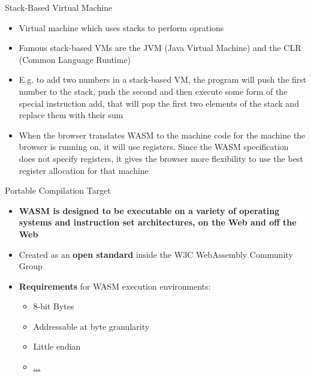 \documentclass{beamer}
\begin{document}
\begin{frame}{Stack-Based Virtual Machine}
    \begin{itemize}
        \item Virtual machine which uses stacks to perform oprations
        \item Famous stack-based VMs are the JVM (Java Virtual Machine) and the CLR (Common Language Runtime)
        \item E.g. to add two numbers in a stack-based VM, the program will push the first number to the stack, push the second and then execute some form of the special instruction add, that will pop the first two elements of the stack and replace them with their sum
        \item When the browser translates WASM to the machine code for the machine the browser is running on, it will use registers. Since the WASM specification does not specify registers, it gives the browser more flexibility to use the best register allocation for  that machine
    \end{itemize}
\end{frame}

\begin{frame}{Portable Compilation Target}
    \begin{itemize}
        \item \textbf{WASM is designed to be executable on a variety of operating systems and instruction set architectures, on the Web and off the Web}
        \item Created as an \textbf{open standard} inside the W3C WebAssembly Community Group
        \item \textbf{Requirements} for WASM execution environments:
              \begin{itemize}
                  \item 8-bit Bytes
                  \item Addressable at byte granularity
                  \item Little endian
                  \item \href{https://webassembly.org/docs/portability/}{...}
              \end{itemize}
    \end{itemize}
\end{frame}
\end{document}

